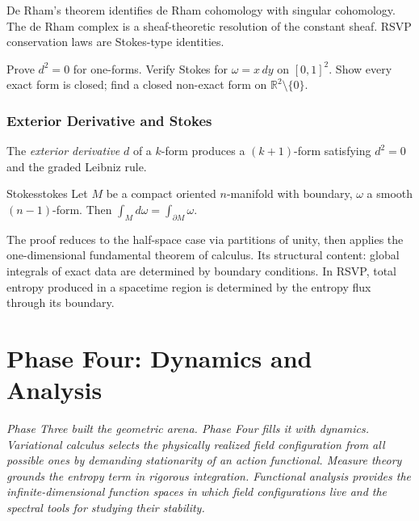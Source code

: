 \documentclass[12pt, twoside, openright, a4paper]{book}
\newcommand{\R}{\mathbb{R}}
\newcommand{\partintro}[1]{%
  \begin{tcolorbox}[enhanced, colback=RSVPdeep, colframe=RSVPdeep, coltext=white,
    arc=6pt, boxrule=0pt, left=8mm, right=8mm, top=6mm, bottom=6mm]
  \large\itshape #1\end{tcolorbox}}
\begin{document}
\begin{dependencies}
De Rham's theorem identifies de Rham cohomology with singular cohomology.
The de Rham complex is a sheaf-theoretic resolution of the constant sheaf.
RSVP conservation laws are Stokes-type identities.
\end{dependencies}

\begin{exercises_box}
Prove $d^2 = 0$ for one-forms.
Verify Stokes for $\omega = x\,dy$ on $[0,1]^2$.
Show every exact form is closed; find a closed non-exact form on $\R^2 \setminus \{0\}$.
\end{exercises_box}

\section{Exterior Derivative and Stokes}

The \emph{exterior derivative} $d$ of a $k$-form produces a $(k+1)$-form satisfying $d^2 = 0$ and the graded Leibniz rule.

\begin{theorem}{Stokes}{stokes}
Let $M$ be a compact oriented $n$-manifold with boundary, $\omega$ a smooth $(n-1)$-form.
Then $\displaystyle\int_M d\omega = \int_{\partial M}\omega$.
\end{theorem}

The proof reduces to the half-space case via partitions of unity, then applies the one-dimensional fundamental theorem of calculus.
Its structural content: global integrals of exact data are determined by boundary conditions.
In RSVP, total entropy produced in a spacetime region is determined by the entropy flux through its boundary.

\part{Phase Four: Dynamics and Analysis}

\partintro{Phase Three built the geometric arena. Phase Four fills it with
dynamics. Variational calculus selects the physically realized field
configuration from all possible ones by demanding stationarity of an action
functional. Measure theory grounds the entropy term in rigorous integration.
Functional analysis provides the infinite-dimensional function spaces in which
field configurations live and the spectral tools for studying their stability.}
\end{document}
